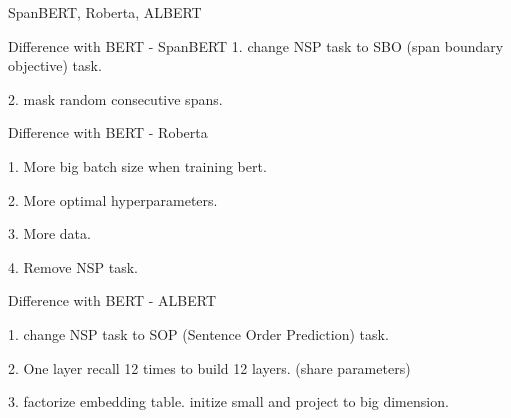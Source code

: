 \documentclass[10pt]{beamer}
\begin{document}
    \begin{frame}{SpanBERT, Roberta, ALBERT}
      \begin{exampleblock}{Difference with BERT    - SpanBERT}
        1. change NSP task to SBO (span boundary objective) task.

        2. mask random consecutive spans.   

      \end{exampleblock}

      \begin{exampleblock}{Difference with BERT    - Roberta}

        1. More big batch size when training bert.
 
        2. More optimal hyperparameters.
 
        3. More data.

        4. Remove NSP task.
       \end{exampleblock}

       \begin{exampleblock}{Difference with BERT   - ALBERT}

        1. change NSP task to SOP (Sentence Order Prediction) task.

        2. One layer recall 12 times to build 12 layers. (share parameters)
 
        3. factorize embedding table. initize small and project to big dimension.
       \end{exampleblock}


    \end{frame}
\end{document}
